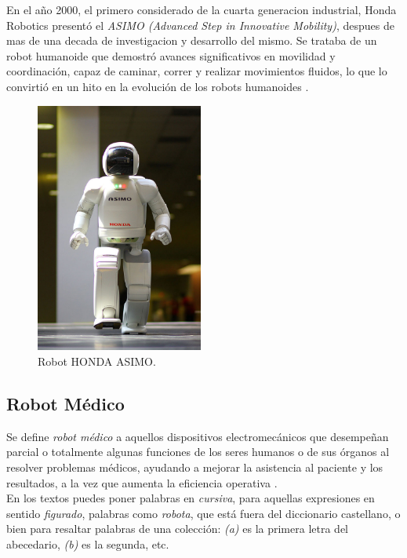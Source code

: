 En el año 2000, el primero considerado de la cuarta generacion industrial, Honda Robotics presentó el \emph{ASIMO (Advanced Step in Innovative Mobility)}, despues de mas de una decada de investigacion y desarrollo del mismo. Se trataba de un robot humanoide que demostró avances significativos en movilidad y coordinación, capaz de caminar, correr y realizar movimientos fluidos, lo que lo convirtió en un hito en la evolución de los robots humanoides \cite{HONDA}.\\
  
  \begin{figure} [h!]
    \begin{center}
      \includegraphics[width=55mm]{figs/ASIMO.jpg}
    \end{center}
    \caption{Robot HONDA ASIMO.}
    \label{fig:ASIMO}
  \end{figure}

\subsection{Robot Médico}
\label{sec:robotica_industrial} 

Se define \textit{robot médico} a aquellos dispositivos electromecánicos que desempeñan parcial o totalmente algunas funciones de los seres humanos o de sus órganos al resolver problemas médicos, ayudando a mejorar la asistencia al paciente y los resultados, a la vez que aumenta la eficiencia operativa \cite{Kraevsky10}.\\

En los textos puedes poner palabras en \textit{cursiva}, para aquellas expresiones en sentido \textit{figurado}, palabras como \textit{robota}, que está fuera del diccionario castellano, o bien para resaltar palabras de una colección: \textit{(a)} es la primera letra del abecedario, \textit{(b)} es la segunda, etc.\\


